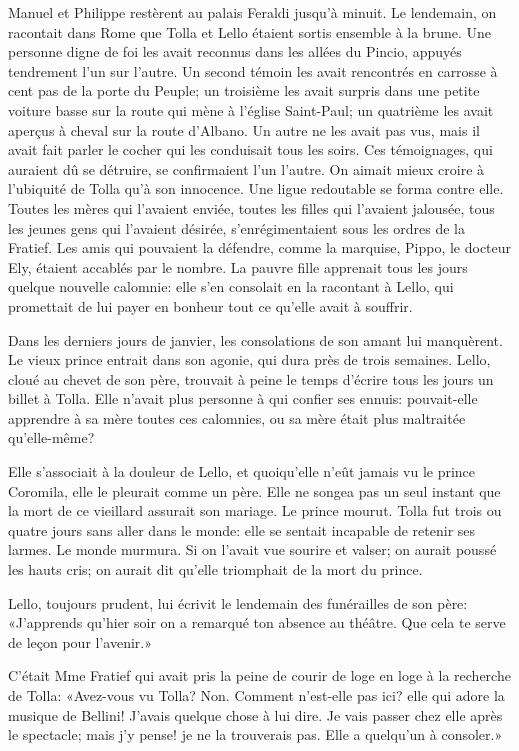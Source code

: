 Manuel et Philippe restèrent au palais Feraldi jusqu'à minuit. Le
lendemain, on racontait dans Rome que Tolla et Lello étaient sortis
ensemble à la brune. Une personne digne de foi les avait reconnus dans
les allées du Pincio, appuyés tendrement l'un sur l'autre. Un second
témoin les avait rencontrés en carrosse à cent pas de la porte du
Peuple; un troisième les avait surpris dans une petite voiture basse sur
la route qui mène à l'église Saint-Paul; un quatrième les avait aperçus
à cheval sur la route d'Albano. Un autre ne les avait pas vus, mais il
avait fait parler le cocher qui les conduisait tous les soirs. Ces
témoignages, qui auraient dû se détruire, se confirmaient l'un l'autre.
On aimait mieux croire à l'ubiquité de Tolla qu'à son innocence. Une
ligue redoutable se forma contre elle. Toutes les mères qui l'avaient
enviée, toutes les filles qui l'avaient jalousée, tous les jeunes gens
qui l'avaient désirée, s'enrégimentaient sous les ordres de la Fratief.
Les amis qui pouvaient la défendre, comme la marquise, Pippo, le docteur
Ely, étaient accablés par le nombre. La pauvre fille apprenait tous les
jours quelque nouvelle calomnie: elle s'en consolait en la racontant à
Lello, qui promettait de lui payer en bonheur tout ce qu'elle avait à
souffrir.

Dans les derniers jours de janvier, les consolations de son amant lui
manquèrent. Le vieux prince entrait dans son agonie, qui dura près de
trois semaines. Lello, cloué au chevet de son père, trouvait à peine le
temps d'écrire tous les jours un billet à Tolla. Elle n'avait plus
personne à qui confier ses ennuis: pouvait-elle apprendre à sa mère
toutes ces calomnies, ou sa mère était plus maltraitée qu'elle-même?

Elle s'associait à la douleur de Lello, et quoiqu'elle n'eût jamais vu
le prince Coromila, elle le pleurait comme un père. Elle ne songea pas
un seul instant que la mort de ce vieillard assurait son mariage. Le
prince mourut. Tolla fut trois ou quatre jours sans aller dans le monde:
elle se sentait incapable de retenir ses larmes. Le monde murmura. Si on
l'avait vue sourire et valser; on aurait poussé les hauts cris; on
aurait dit qu'elle triomphait de la mort du prince.

Lello, toujours prudent, lui écrivit le lendemain des funérailles de son
père: «J'apprends qu'hier soir on a remarqué ton absence au théâtre. Que
cela te serve de leçon pour l'avenir.»

C'était Mme Fratief qui avait pris la peine de courir de loge en loge à
la recherche de Tolla: «Avez-vous vu Tolla? Non. Comment n'est-elle pas
ici? elle qui adore la musique de Bellini! J'avais quelque chose à lui
dire. Je vais passer chez elle après le spectacle; mais j'y pense! je ne
la trouverais pas. Elle a quelqu'un à consoler.»

